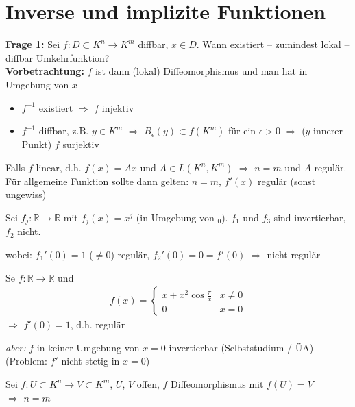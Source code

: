 \section{Inverse und implizite Funktionen}\setcounter{equation}{0}
\textbf{Frage 1:} Sei $f:D\subset K^n\to K^m$ \gls{diffbar}, $x\in D$. Wann existiert -- zumindest lokal -- \gls{diffbar} Umkehrfunktion?\\

\textbf{Vorbetrachtung:} $f$ ist dann (lokal) Diffeomorphismus und man hat in Umgebung von $x$ \begin{itemize}
		\item $f^{-1}$ existiert $\Rightarrow$ $f$ injektiv
		\item $f^{-1}$ \gls{diffbar}, z.B. $y\in K^m$ $\Rightarrow$ $B_{\epsilon}(y)\subset f(K^m)$ für ein $\epsilon > 0$ $\Rightarrow$ ($y$ innerer Punkt) $f$ surjektiv
	\end{itemize}

	Falls $f$ linear, d.h. $f(x) = Ax$ und $A\in L(K^n, K^m)$ $\Rightarrow$ $n=m$ und $A$ regulär.\\
	
	Für allgemeine Funktion sollte dann gelten: $n=m$, $f'(x)$ regulär (sonst ungewiss)\\

\begin{example}
	Sei $f_j:\mathbb{R}\to\mathbb{R}$ mit $f_j(x) = x^j$ (in Umgebung von $_0$). $f_1$ und $f_3$ sind invertierbar, $f_2$ nicht.
	
	wobei: $f_1'(0)=1$ ($\neq 0$) regulär, $f_2'(0) = 0 = f'(0)$ $\Rightarrow$ nicht regulär
\end{example}

\begin{example}
	Se $f:\mathbb{R}\to\mathbb{R}$ und \begin{align*}
		f(x) = \begin{cases}
			x + x^2\cos \frac{\pi}{x} & x\neq 0 \\ 0 & x=0
		\end{cases}
	\end{align*}
	$\Rightarrow$ $f'(0) = 1$, d.h. regulär
	
	\emph{aber:} $f$ in keiner Umgebung von $x=0$ invertierbar (Selbststudium / ÜA) (Problem: $f'$ nicht stetig in $x=0$)
\end{example}

\begin{lemma}
	Sei $f:U\subset K^n\to V\subset K^m$, $U$, $V$ offen, $f$ Diffeomorphismus mit $f(U) = V$\\
	$\Rightarrow$ $n = m$
\end{lemma}

